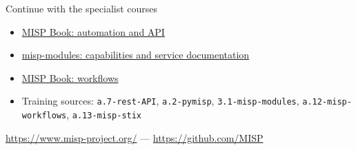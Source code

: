 \begin{frame}{Continue with the specialist courses}
\small
\begin{itemize}
\item \href{https://www.circl.lu/doc/misp/automation/}{MISP Book: automation and API}
\item \href{https://misp.github.io/misp-modules/}{misp-modules: capabilities and service documentation}
\item \href{https://www.circl.lu/doc/misp/workflows/}{MISP Book: workflows}
\item Training sources: \texttt{a.7-rest-API}, \texttt{a.2-pymisp},\newline
\texttt{3.1-misp-modules}, \texttt{a.12-misp-workflows}, \texttt{a.13-misp-stix}
\end{itemize}
\medskip
\url{https://www.misp-project.org/} --- \url{https://github.com/MISP}
\end{frame}
